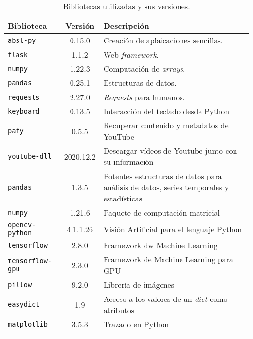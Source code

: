 \begin{table}[p]
    \centering
    \begin{tabular}{lcl}
        \toprule
        \textbf{Biblioteca} & \textbf{Versión} & \textbf{Descripción}\\
        \midrule
        \rowcolor[HTML]{EFEFEF} 
        \texttt{absl-py} & 0.15.0 & Creación de aplaicaciones sencillas.\\
        \texttt{flask} & 1.1.2 & Web \textit{framework}.\\ \rowcolor[HTML]{EFEFEF}
        \texttt{numpy} & 1.22.3 & Computación de \textit{arrays}.\\
        \texttt{pandas} & 0.25.1 & Estructuras de datos.\\ \rowcolor[HTML]{EFEFEF}
        \texttt{requests} & 2.27.0 & \textit{Requests} para humanos.\\
        \texttt{keyboard} & 0.13.5 & Interacción del teclado desde Python\\ \rowcolor[HTML]{EFEFEF}
        \texttt{pafy} & 0.5.5 & Recuperar contenido y metadatos de YouTube\\        
        \texttt{youtube-dll} & 2020.12.2 & Descargar vídeos de Youtube junto con su información\\ \rowcolor[HTML]{EFEFEF}
        \texttt{pandas} & 1.3.5 & Potentes estructuras de datos para análisis de datos, series temporales y estadísticas\\
        \texttt{numpy} & 1.21.6 & Paquete de computación matricial\\ \rowcolor[HTML]{EFEFEF}
        \texttt{opencv-python} & 4.1.1.26 & Visión Artificial para el lenguaje Python\\
        \texttt{tensorflow} & 2.8.0 & Framework dw Machine Learning\\ \rowcolor[HTML]{EFEFEF}
        \texttt{tensorflow-gpu} & 2.3.0 & Framework de Machine Learning para GPU\\
        \texttt{pillow} & 9.2.0 & Librería de imágenes\\ \rowcolor[HTML]{EFEFEF}
        \texttt{easydict} & 1.9 & Acceso a los valores de un \textit{dict} como atributos\\
        \texttt{matplotlib} & 3.5.3 & Trazado en Python\\ \rowcolor[HTML]{EFEFEF}
        \bottomrule
    \end{tabular}
    \caption{Bibliotecas utilizadas y sus versiones.}\label{tab:bibliotecas-python}
\end{table}

